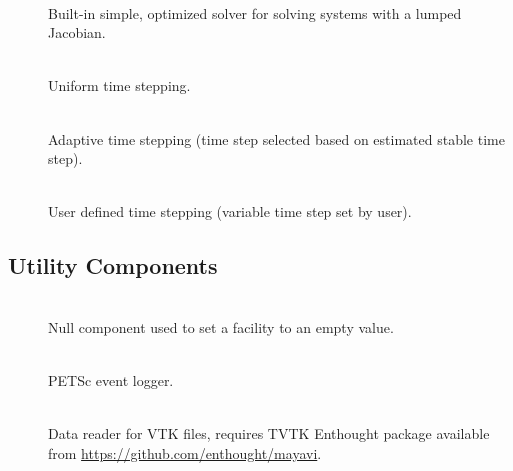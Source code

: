 \begin{description}
\item [] \\
Built-in simple, optimized solver for solving systems with a lumped
Jacobian.
\item [] \\
Uniform time stepping.
\item [] \\
Adaptive time stepping (time step selected based on estimated stable
time step).
\item [] \\
User defined time stepping (variable time step set by user).
\end{description}

\subsection{Utility Components}
\begin{description}
\item [] \\
Null component used to set a facility to an empty value.
\item [] \\
PETSc event logger.
\item [] \\
Data reader for VTK files, requires TVTK Enthought package available
from \url{https://github.com/enthought/mayavi}.
\end{description}

